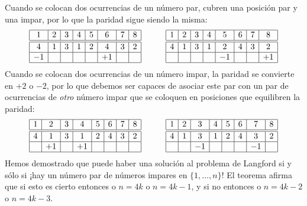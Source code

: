 Cuando se colocan dos ocurrencias de un número par, cubren una posición par y una impar, por lo que la paridad sigue siendo la misma:
\[
\begin{array}{|c|c|c|c|c|c|c|c|}
\hline
1&2&3&4&5&6&7&8\\
\hline\hline
4&1&3&1&2&4&3&2\\\hline
-1&&&&&+1&&\\\hline
\end{array}
\hspace{3em}
\begin{array}{|c|c|c|c|c|c|c|c|}
\hline
1&2&3&4&5&6&7&8\\
\hline\hline
4&1&3&1&2&4&3&2\\\hline
&&&&-1&&&+1\\\hline
\end{array}
\]
Cuando se colocan dos ocurrencias de un número impar, la paridad se convierte en $+2$ o $-2$, por lo que debemos ser capaces de asociar este par con un par de ocurrencias de \emph{otro} número impar que se coloquen en posiciones que equilibren la paridad:
\[
\begin{array}{|c|c|c|c|c|c|c|c|}
\hline
1&2&3&4&5&6&7&8\\
\hline\hline
4&1&3&1&2&4&3&2\\\hline
&+1&&+1&&&&\\\hline
\end{array}
\hspace{3em}
\begin{array}{|c|c|c|c|c|c|c|c|}
\hline
1&2&3&4&5&6&7&8\\
\hline\hline
4&1&3&1&2&4&3&2\\\hline
&&-1&&&&-1&\\\hline
\end{array}
\]
Hemos demostrado que puede haber una solución al problema de Langford si y sólo si ¡hay un número par de números impares en $\{1,\ldots,n\}$!
El teorema afirma que si esto es cierto entonces o $n=4k$ o $n=4k-1$, y si no entonces o $n=4k-2$ o $n=4k-3$.

